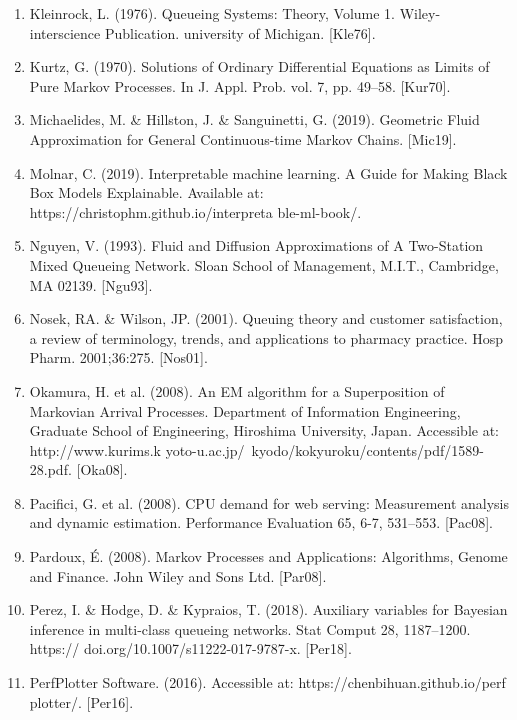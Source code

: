 \documentclass[a4paper,11pt,titlepage]{article}
\begin{document}
\begin{enumerate}
\item Kleinrock, L. (1976). Queueing Systems: Theory, Volume 1. Wiley-interscience Publication. university of Michigan. [Kle76].

\item Kurtz, G. (1970). Solutions of Ordinary Differential Equations as Limits of Pure Markov Processes. In J. Appl. Prob. vol. 7, pp. 49–58. [Kur70]. 

\item Michaelides, M. & Hillston, J. & Sanguinetti, G. (2019). Geometric Fluid Approximation for General
Continuous-time Markov Chains. [Mic19]. 

\item Molnar, C. (2019). Interpretable machine learning. A Guide for Making Black Box Models Explainable. Available at: https://christophm.github.io/interpreta
ble-ml-book/.

\item Nguyen, V. (1993). Fluid and Diffusion Approximations of A Two-Station Mixed Queueing Network. Sloan School of Management, M.I.T., Cambridge, MA 02139. [Ngu93]. 

\item Nosek, RA. & Wilson, JP. (2001). Queuing theory and customer satisfaction, a review of terminology, trends, and applications to pharmacy practice. Hosp Pharm. 2001;36:275. [Nos01]. 

\item Okamura, H. et al. (2008). An EM algorithm for a Superposition of Markovian Arrival Processes. Department of Information Engineering, Graduate School of Engineering,
Hiroshima University, Japan. Accessible at: http://www.kurims.k
yoto-u.ac.jp/~kyodo/kokyuroku/contents/pdf/1589-28.pdf. [Oka08]. 

\item Pacifici, G. et al. (2008). CPU demand for web serving: Measurement analysis and dynamic estimation. Performance Evaluation 65, 6-7, 531–553. [Pac08]. 

\item Pardoux, É. (2008). Markov Processes and Applications: Algorithms, Genome and Finance. John Wiley and Sons Ltd. [Par08].

\item Perez, I. & Hodge, D. & Kypraios, T. (2018). Auxiliary variables for Bayesian inference in multi-class queueing networks. Stat Comput 28, 1187–1200. https://
doi.org/10.1007/s11222-017-9787-x. [Per18]. 

\item PerfPlotter Software. (2016). Accessible at: https://chenbihuan.github.io/perf
plotter/. [Per16].


\end{enumerate}
\end{document}
